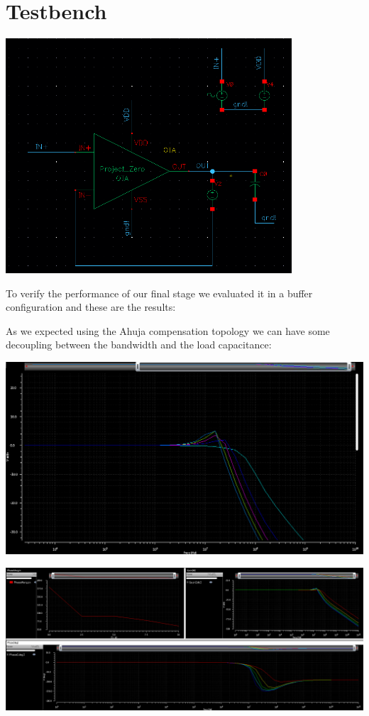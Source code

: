 \section{Testbench}

\centering
\includegraphics[width=0.8\textwidth]{Capitoli/tb.png}
\raggedright



To verify the performance of our final stage we evaluated it in a buffer configuration and these are the results:

As we expected using the Ahuja compensation topology we can have some decoupling between the bandwidth and the load capacitance:


\centering
\includegraphics[width=1\textwidth]{Capitoli/cap.png}
\raggedright

\centering
\includegraphics[width=1\textwidth]{Capitoli/rst.png}
\raggedright


